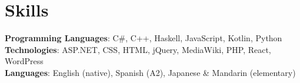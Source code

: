 \section{Skills}
\begin{itemize}[leftmargin=0.15in, label={}]
\small{\item{
    \textbf{Programming Languages}{: C\#, C++, Haskell, JavaScript, Kotlin, Python} \\
    \textbf{Technologies}{: ASP.NET, CSS, HTML, jQuery, MediaWiki, PHP, React, WordPress} \\
    \textbf{Languages}{: English (native), Spanish (A2), Japanese \& Mandarin (elementary)} \\
}}
\end{itemize}